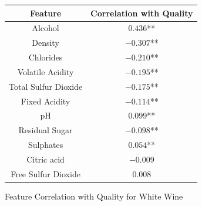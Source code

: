   \begin{figure}[htb]
  \centering %

 \begin{tabular}{|c|c|} 
   \hline \hline %
    Feature & Correlation with Quality \\ %
    \hline %
    Alcohol & $0.436$** \\
     \hline
    Density & $-0.307$** \\
     \hline
    Chlorides & $-0.210$** \\
     \hline
    Volatile Acidity   & $-0.195$** \\
     \hline
    Total Sulfur Dioxide  & $-0.175$** \\
     \hline
    Fixed Acidity  & $-0.114$** \\
     \hline
    pH & $0.099$** \\
     \hline
    Residual Sugar & $-0.098$** \\
     \hline
    Sulphates  & $0.054$** \\
     \hline
    Citric acid   & $-0.009$ \\
     \hline
    Free Sulfur Dioxide  & $0.008$ \\
  
    \hline \hline  
    \end{tabular}
  \caption{Feature Correlation with Quality for White Wine}
  \label{tab:example}


\end{figure}


